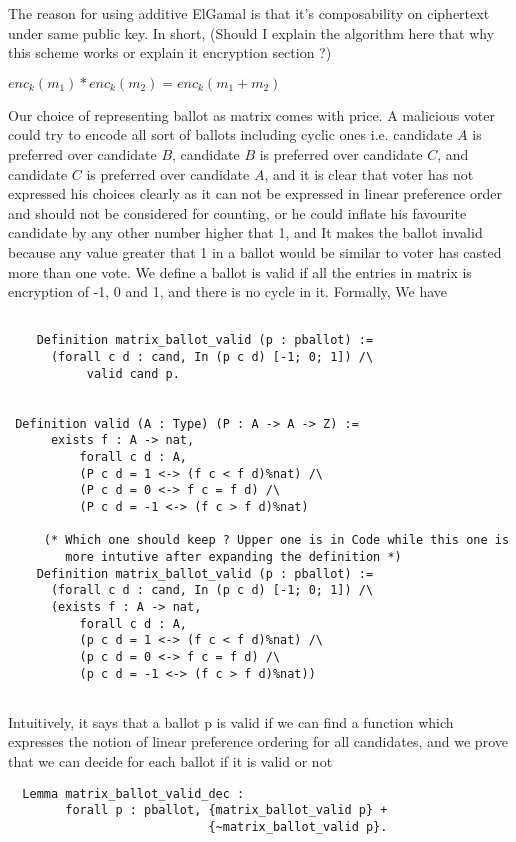 \documentclass{llncs}
\begin{document}
 The reason for using additive ElGamal is that it's composability on ciphertext 
 under same public key. In short,  (Should I explain the algorithm here that 
  why this scheme works or explain it encryption section ?)
 \begin{center}  
	$enc_{k}(m_{1}) * enc_{k}(m_{2}) = enc_{k} (m_{1} + m_{2})$
 \end{center}
 Our choice of representing ballot as matrix comes with price. A malicious 
 voter could try to encode all sort of ballots including cyclic ones i.e. candidate
 $A$ is preferred over candidate $B$, candidate $B$ is preferred over candidate $C$, 
 and candidate $C$ is preferred over candidate $A$, and it is clear that voter has
 not expressed his choices clearly as it can not be expressed in linear preference order 
 and should not be considered for counting, or 
 he could inflate his favourite candidate by any other number higher that 1, and It 
 makes the ballot invalid because any value greater that 1 in a ballot would be similar
 to voter has casted more than one vote. We define a ballot is valid if all the 
 entries in matrix is encryption of -1, 0 and 1, and there is no cycle in it. Formally, We have
 \begin{verbatim}
 
	Definition matrix_ballot_valid (p : pballot) :=
      (forall c d : cand, In (p c d) [-1; 0; 1]) /\
	       valid cand p.  
 
 
 Definition valid (A : Type) (P : A -> A -> Z) :=
      exists f : A -> nat,
          forall c d : A,
          (P c d = 1 <-> (f c < f d)%nat) /\
          (P c d = 0 <-> f c = f d) /\ 
          (P c d = -1 <-> (f c > f d)%nat)
          
     (* Which one should keep ? Upper one is in Code while this one is 
        more intutive after expanding the definition *) 
    Definition matrix_ballot_valid (p : pballot) :=
      (forall c d : cand, In (p c d) [-1; 0; 1]) /\
      (exists f : A -> nat,
          forall c d : A,
          (p c d = 1 <-> (f c < f d)%nat) /\
          (p c d = 0 <-> f c = f d) /\ 
          (p c d = -1 <-> (f c > f d)%nat))
    
 \end{verbatim}
 Intuitively, it says that a ballot p is valid if we can find a function which
  expresses 
 the notion of linear preference ordering for all candidates, and 
 we prove that we can decide for each ballot if it is valid or not 
 \begin{verbatim}
  Lemma matrix_ballot_valid_dec : 
        forall p : pballot, {matrix_ballot_valid p} +
                            {~matrix_ballot_valid p}.
 \end{verbatim}
 
\end{document}
